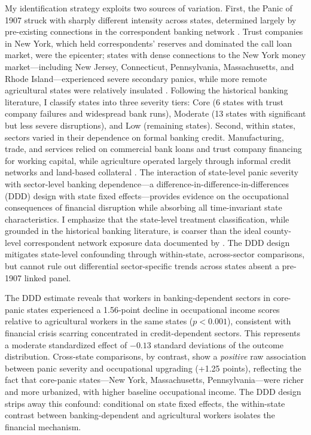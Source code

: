 \documentclass[12pt]{article}
\begin{document}
My identification strategy exploits two sources of variation. First, the Panic of 1907 struck with sharply different intensity across states, determined largely by pre-existing connections in the correspondent banking network \citep{frydman2023panic}. Trust companies in New York, which held correspondents' reserves and dominated the call loan market, were the epicenter; states with dense connections to the New York money market---including New Jersey, Connecticut, Pennsylvania, Massachusetts, and Rhode Island---experienced severe secondary panics, while more remote agricultural states were relatively insulated \citep{wicker2000banking}. Following the historical banking literature, I classify states into three severity tiers: Core (6 states with trust company failures and widespread bank runs), Moderate (13 states with significant but less severe disruptions), and Low (remaining states). Second, within states, sectors varied in their dependence on formal banking credit. Manufacturing, trade, and services relied on commercial bank loans and trust company financing for working capital, while agriculture operated largely through informal credit networks and land-based collateral \citep{james1978money}. The interaction of state-level panic severity with sector-level banking dependence---a difference-in-difference-in-differences (DDD) design with state fixed effects---provides evidence on the occupational consequences of financial disruption while absorbing all time-invariant state characteristics. I emphasize that the state-level treatment classification, while grounded in the historical banking literature, is coarser than the ideal county-level correspondent network exposure data documented by \citet{frydman2023panic}. The DDD design mitigates state-level confounding through within-state, across-sector comparisons, but cannot rule out differential sector-specific trends across states absent a pre-1907 linked panel.

The DDD estimate reveals that workers in banking-dependent sectors in core-panic states experienced a 1.56-point decline in occupational income scores relative to agricultural workers in the same states ($p < 0.001$), consistent with financial crisis scarring concentrated in credit-dependent sectors. This represents a moderate standardized effect of $-0.13$ standard deviations of the outcome distribution. Cross-state comparisons, by contrast, show a \textit{positive} raw association between panic severity and occupational upgrading (+1.25 points), reflecting the fact that core-panic states---New York, Massachusetts, Pennsylvania---were richer and more urbanized, with higher baseline occupational income. The DDD design strips away this confound: conditional on state fixed effects, the within-state contrast between banking-dependent and agricultural workers isolates the financial mechanism.
\end{document}
